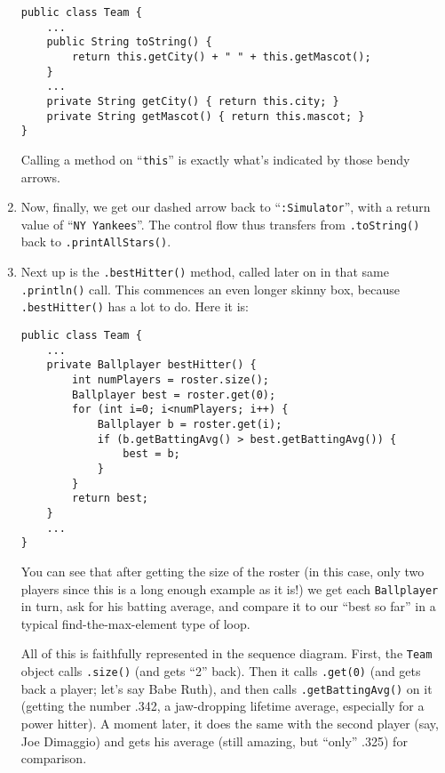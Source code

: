 \begin{enumerate}
\begin{Verbatim}[fontsize=\footnotesize,samepage=true,frame=single]
public class Team {
    ...
    public String toString() {
        return this.getCity() + " " + this.getMascot();
    }
    ...
    private String getCity() { return this.city; }
    private String getMascot() { return this.mascot; }
}
\end{Verbatim}

Calling a method on ``\texttt{this}'' is exactly what's indicated by those
bendy arrows.

\item Now, finally, we get our dashed arrow back to ``\texttt{:Simulator}'',
with a return value of ``\texttt{NY Yankees}''. The control flow thus transfers
from \texttt{.toString()} back to \texttt{.printAllStars()}.

\item Next up is the \texttt{.bestHitter()} method, called later on in that
same \texttt{.println()} call. This commences an even longer skinny box,
because \texttt{.bestHitter()} has a lot to do. Here it is:

\begin{Verbatim}[fontsize=\scriptsize,samepage=true,frame=single]
public class Team {
    ...
    private Ballplayer bestHitter() {
        int numPlayers = roster.size();
        Ballplayer best = roster.get(0);
        for (int i=0; i<numPlayers; i++) {
            Ballplayer b = roster.get(i);
            if (b.getBattingAvg() > best.getBattingAvg()) {
                best = b;
            }
        }
        return best;
    }
    ...
}
\end{Verbatim}

You can see that after getting the size of the roster (in this case, only two
players since this is a long enough example as it is!) we get each
\texttt{Ballplayer} in turn, ask for his batting average, and compare it to
our ``best so far'' in a typical find-the-max-element type of loop.

All of this is faithfully represented in the sequence diagram. First, the
\texttt{Team} object calls \texttt{.size()} (and gets ``2'' back). Then it
calls \texttt{.get(0)} (and gets back a player; let's say Babe Ruth), and then
calls \texttt{.getBattingAvg()} on it (getting the number .342, a jaw-dropping
lifetime average, especially for a power hitter). A moment later, it does the
same with the second player (say, Joe Dimaggio) and gets his average (still
amazing, but ``only'' .325) for comparison.


\end{enumerate}
